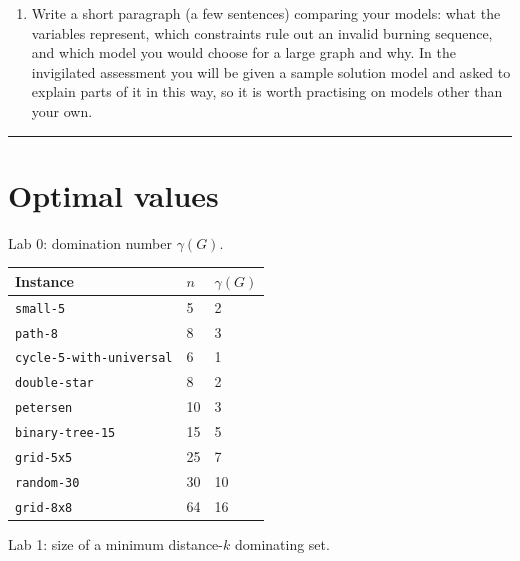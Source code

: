 \documentclass[11pt]{article}
\begin{document}
\begin{enumerate}
\begin{itemize}
\item \emph{A different model.} Show that $(x_1, \dots, x_b)$ is a burning sequence if and only if every vertex $u$ satisfies $d(u, x_i) \le b - i$ for some $i$. Use this characterisation, together with the ideas of Lab 2 Part B, to write a model with no \mbox{\texttt{burnt}} array at all. How does it compare with your simulation model?
\item \emph{Solvers.} Compare \mbox{\texttt{gecode}}, \mbox{\texttt{chuffed}} and a MIP solver on your models.
\end{itemize}
\item Write a short paragraph (a few sentences) comparing your models: what the variables represent, which constraints rule out an invalid burning sequence, and which model you would choose for a large graph and why. In the invigilated assessment you will be given a sample solution model and asked to explain parts of it in this way, so it is worth practising on models other than your own.
\end{enumerate}
\bigskip\hrule\bigskip

\section*{Optimal values}

Lab 0: domination number $\gamma(G)$.

\begin{center}
\small
\begin{tabular}{lll}
\toprule
Instance & $n$ & $\gamma(G)$ \\
\midrule
\mbox{\texttt{small-{}5}} & 5 & 2 \\
\mbox{\texttt{path-{}8}} & 8 & 3 \\
\texttt{cycle-{}5-{}with-{}universal} & 6 & 1 \\
\mbox{\texttt{double-{}star}} & 8 & 2 \\
\mbox{\texttt{petersen}} & 10 & 3 \\
\mbox{\texttt{binary-{}tree-{}15}} & 15 & 5 \\
\mbox{\texttt{grid-{}5x5}} & 25 & 7 \\
\mbox{\texttt{random-{}30}} & 30 & 10 \\
\mbox{\texttt{grid-{}8x8}} & 64 & 16 \\
\bottomrule
\end{tabular}
\end{center}

Lab 1: size of a minimum distance-$k$ dominating set.
\end{document}
